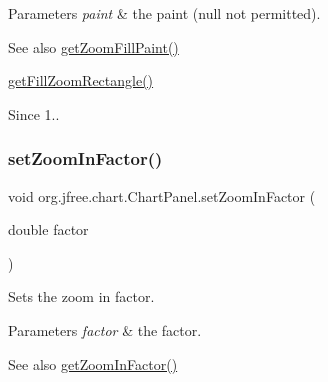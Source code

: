 \begin{DoxyParams}{Parameters}
{\em paint} & the paint ({\ttfamily null} not permitted).\\
\hline
\end{DoxyParams}
\begin{DoxySeeAlso}{See also}
\mbox{\hyperlink{classorg_1_1jfree_1_1chart_1_1_chart_panel_aa67bc49f93e13a11fa4be9fcff4bead8}{get\+Zoom\+Fill\+Paint()}} 

\mbox{\hyperlink{classorg_1_1jfree_1_1chart_1_1_chart_panel_a718c81edc5ae54b6fb8221d6ac05947d}{get\+Fill\+Zoom\+Rectangle()}}
\end{DoxySeeAlso}
\begin{DoxySince}{Since}
1.. 
\end{DoxySince}
\mbox{\label{classorg_1_1jfree_1_1chart_1_1_chart_panel_a625413df0991bdbdbe999f73f30f2fd3}} 
\subsubsection{\texorpdfstring{set\+Zoom\+In\+Factor()}{setZoomInFactor()}}
{\footnotesize\ttfamily void org.\+jfree.\+chart.\+Chart\+Panel.\+set\+Zoom\+In\+Factor (\begin{DoxyParamCaption}\item[{double}]{factor }\end{DoxyParamCaption})}

Sets the zoom in factor.


\begin{DoxyParams}{Parameters}
{\em factor} & the factor.\\
\hline
\end{DoxyParams}
\begin{DoxySeeAlso}{See also}
\mbox{\hyperlink{classorg_1_1jfree_1_1chart_1_1_chart_panel_a43dfc4192b55821224ea51b414f7494c}{get\+Zoom\+In\+Factor()}} 
\end{DoxySeeAlso}
\mbox{\label{classorg_1_1jfree_1_1chart_1_1_chart_panel_a138eceeb021b5e8c28c829bb5c3cb0e4}} 
